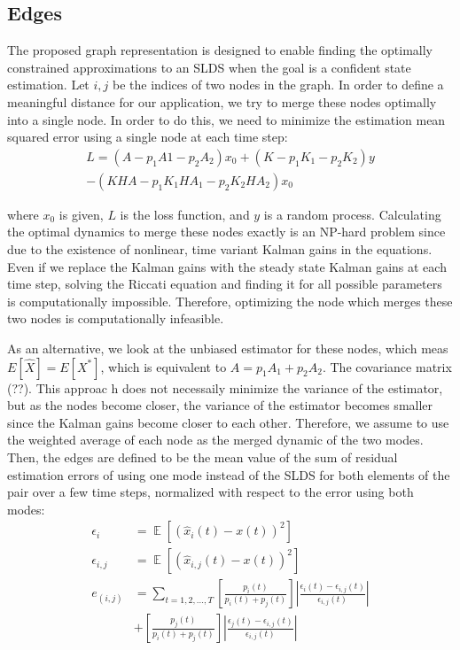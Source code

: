 \documentclass[journal]{IEEEtran}
\DeclareMathOperator{\E}{\mathbb{E}}
\begin{document}
\subsection{Edges}
 The proposed graph representation is designed to enable finding the optimally constrained approximations to an SLDS when the goal is a confident state estimation. Let $i,j$ be the indices of two nodes in the graph. In order to define a meaningful distance for our application, we try to merge these nodes optimally into a single node. In order to do this, we need to minimize the estimation mean squared error using a single node at each time step:
  \begin{align}
    L = (A-p_1A1-p_2A_2)x_0 + (K - p_1K_1 - p_2K_2)y\\
    -(KHA-p_1K_1HA_1-p_2K_2HA_2)x_0 
\end{align}

where $x_0$ is given, $L$ is the loss function, and $y$ is a random process. Calculating the optimal dynamics to merge these nodes exactly is an NP-hard problem since due to the existence of nonlinear, time variant Kalman gains in the equations. Even if we replace the Kalman gains with the steady state Kalman gains at each time step, solving the Riccati equation and finding it for all possible parameters is computationally impossible. Therefore, optimizing the node which merges these two nodes is computationally infeasible. 


As an alternative, we look at the unbiased estimator for these nodes, which meas $E[\hat{X}]=E[X^*]$, which is equivalent to $A = p_1 A_1 +p_2 A_2$. The covariance matrix (??). This approac h does not necessaily minimize the variance of the estimator, but as the nodes become closer, the variance of the estimator becomes smaller since the Kalman gains become closer to each other. Therefore, we assume to use the weighted average of each node as the merged dynamic of the two modes. Then, the edges are defined to be the mean value of the sum of residual estimation errors of using one mode instead of the SLDS for both elements of the pair over a few time steps, normalized with respect to the error using both modes:
 \begin{align}
     \epsilon_i &= \E[(\hat{x}_i (t) - x(t))^2 ]\\
     \epsilon_{i,j} &= \E[(\hat{x}_{i,j} (t) - x(t))^2 ]\\
     e_{(i,j)} &= \sum_{t=1,2,...,T}[\frac{p_i(t)}{p_i(t)+p_j(t)}]|\frac{ \epsilon_i(t)- \epsilon_{i,j}(t)}{ \epsilon_{i,j}(t)}|\\
     &+ [\frac{p_j(t)}{p_i(t)+p_j(t)}]|\frac{ \epsilon_j(t)- \epsilon_{i,j}(t)}{ \epsilon_{i,j}(t)}|
 \end{align}
 
\end{document}
